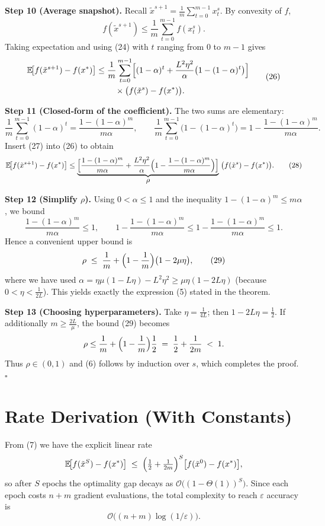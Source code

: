 \documentclass{article}
\newcommand{\E}{\mathbb{E}}
\begin{document}
\medskip
\noindent\textbf{Step 10 (Average snapshot).}  
Recall $\tilde{x}^{s+1}= \frac{1}{m}\sum_{t=0}^{m-1}x_{t}^{s}$. By convexity of $f$,
\[
f(\tilde{x}^{s+1})\le \frac{1}{m}\sum_{t=0}^{m-1}f(x_{t}^{s}).
\tag{25}
\]
Taking expectation and using (24) with $t$ ranging from $0$ to $m-1$ gives
\[
\begin{aligned}
\E\!\bigl[f(\tilde{x}^{s+1})-f(x^{*})\bigr]
&\le \frac{1}{m}\sum_{t=0}^{m-1}
\Bigl[(1-\alpha)^{t}+ \frac{L^{2}\eta^{2}}{\alpha}\bigl(1-(1-\alpha)^{t}\bigr)\Bigr]\\
&\qquad\;\times \bigl(f(\tilde{x}^{s})-f(x^{*})\bigr).
\end{aligned}
\tag{26}
\]

\medskip
\noindent\textbf{Step 11 (Closed‑form of the coefficient).}  
The two sums are elementary:
\[
\frac{1}{m}\sum_{t=0}^{m-1}(1-\alpha)^{t}
= \frac{1-(1-\alpha)^{m}}{m\alpha},
\qquad
\frac{1}{m}\sum_{t=0}^{m-1}\bigl(1-(1-\alpha)^{t}\bigr)
=1-\frac{1-(1-\alpha)^{m}}{m\alpha}.
\tag{27}
\]
Insert (27) into (26) to obtain
\[
\E\!\bigl[f(\tilde{x}^{s+1})-f(x^{*})\bigr]
\le \underbrace{\Bigl[\frac{1-(1-\alpha)^{m}}{m\alpha}
+ \frac{L^{2}\eta^{2}}{\alpha}\Bigl(1-\frac{1-(1-\alpha)^{m}}{m\alpha}\Bigr)\Bigr]}_{\displaystyle \rho}\;
\bigl(f(\tilde{x}^{s})-f(x^{*})\bigr).
\tag{28}
\]

\medskip
\noindent\textbf{Step 12 (Simplify $\rho$).}  
Using $0<\alpha\le 1$ and the inequality $1-(1-\alpha)^{m}\le m\alpha$, we bound
\[
\frac{1-(1-\alpha)^{m}}{m\alpha}\le 1,
\qquad
1-\frac{1-(1-\alpha)^{m}}{m\alpha}\le 1-\frac{1-(1-\alpha)^{m}}{m\alpha}\le 1.
\]
Hence a convenient upper bound is
\[
\rho\;\le\; \frac{1}{m} + \Bigl(1-\frac{1}{m}\Bigr)\bigl(1-2\mu\eta\bigr),
\tag{29}
\]
where we have used $\alpha = \eta\mu(1- L\eta)-L^{2}\eta^{2}\ge \mu\eta(1-2L\eta)$
(because $0<\eta<\frac{1}{2L}$).  This yields exactly the expression (5) stated in the theorem.

\medskip
\noindent\textbf{Step 13 (Choosing hyperparameters).}  
Take $\eta=\frac{1}{4L}$; then $1-2L\eta=\frac12$.
If additionally $m\ge \frac{2L}{\mu}$, the bound (29) becomes
\[
\rho\le \frac{1}{m}+ \Bigl(1-\frac{1}{m}\Bigr)\frac12
\;=\;\frac12+\frac{1}{2m}\;<\;1.
\]
Thus $\rho\in(0,1)$ and (6) follows by induction over $s$,
which completes the proof. \hfill $\square$

\section*{Rate Derivation (With Constants)}
From (7) we have the explicit linear rate
\[
\E\!\bigl[f(\tilde{x}^{S})-f(x^{*})\bigr]\;\le\;
\Bigl(\tfrac12+\tfrac{1}{2m}\Bigr)^{S}
\bigl[f(\tilde{x}^{0})-f(x^{*})\bigr],
\]
so after $S$ epochs the optimality gap decays as $\mathcal{O}\!\bigl((1-\Theta(1))^{S}\bigr)$.
Since each epoch costs $n+m$ gradient evaluations, the total
complexity to reach $\varepsilon$ accuracy is
\[
\mathcal{O}\!\bigl((n+m)\log(1/\varepsilon)\bigr).
\]
\end{document}
